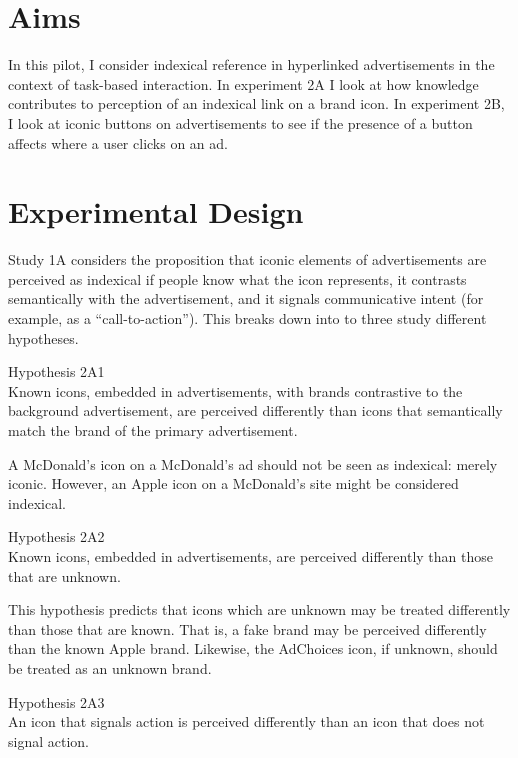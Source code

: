 \section{Aims}
\label{aims}

In this pilot, I consider indexical reference in hyperlinked advertisements in the context of task-based interaction. In experiment 2A I look at how knowledge contributes to perception of an indexical link on a brand icon. In experiment 2B, I look at iconic buttons on advertisements to see if the presence of a button affects where a user clicks on an ad.

\section{Experimental Design}
\label{experimentaldesign}

Study 1A considers the proposition that iconic elements of advertisements are perceived as indexical if people know what the icon represents, it contrasts semantically with the advertisement, and it signals communicative intent (for example, as a ``call-to-action''). This breaks down into to three study different hypotheses.

\begin{description}
\item{Hypothesis 2A1} \hfill \\ 
Known icons, embedded in advertisements, with brands contrastive to the background advertisement, are perceived differently than icons that semantically match the brand of the primary advertisement.
\end{description}
A McDonald's icon on a McDonald's ad should not be seen as indexical: merely iconic. However, an Apple icon on a McDonald's site might be considered indexical.
\begin{description}
\item{Hypothesis 2A2} \hfill \\
Known icons, embedded in advertisements, are perceived differently than those that are unknown.
\end{description}
This hypothesis predicts that icons which are unknown may be treated differently than those that are known. That is, a fake brand may be perceived differently than the known Apple brand. Likewise, the AdChoices icon, if unknown, should be treated as an unknown brand.
\begin{description}
\item{Hypothesis 2A3} \hfill \\
An icon that signals action is perceived differently than an icon that does not signal action.
\end{description}

